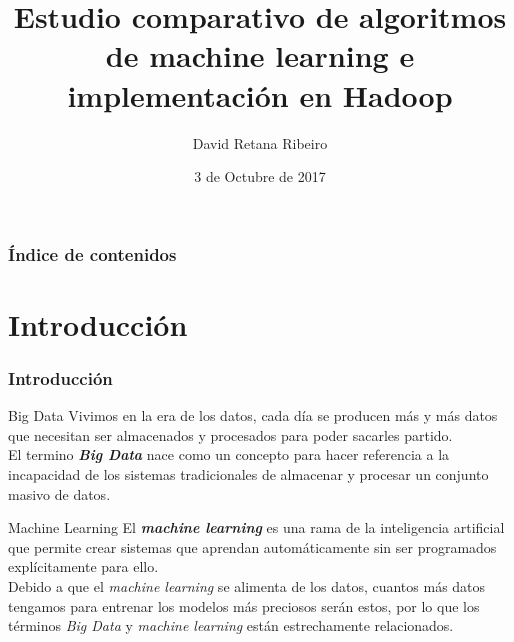 \documentclass{beamer}
\title[Machine Learning y Big Data]{Estudio comparativo de algoritmos de machine learning e implementación en Hadoop}
\author{David Retana Ribeiro}
\institute[UCM]{Universidad Complutense de Madrid \\ \medskip \texttt{davidret@ucm.es}}
\date{3 de Octubre de 2017}
\begin{document}

\begin{frame} %
\titlepage
\end{frame}


\begin{frame} %
\frametitle{Índice de contenidos}
\tableofcontents
\end{frame}


\section{Introducción}

\begin{frame} %
  \frametitle{Introducción}
  \begin{block}{Big Data}
  Vivimos en la era de los datos, cada día se producen más y más datos  que necesitan ser almacenados y
  procesados para poder sacarles partido.\\
  El termino \textbf{\textit{Big Data}} nace como un concepto para hacer referencia a la incapacidad de 
  los sistemas tradicionales de almacenar y procesar un conjunto masivo de datos.
  \end{block}
  
  \begin{block}{Machine Learning}
  El \textbf{\textit{machine learning}} es una rama de la inteligencia artificial que permite crear sistemas que 
  aprendan automáticamente sin ser programados explícitamente para ello.\\
  Debido a que el \textit{machine learning} se alimenta de los datos, cuantos más datos tengamos para
  entrenar los modelos más preciosos serán estos, por lo que los términos \textit{Big Data} y \textit{machine learning}
  están estrechamente relacionados.
  \end{block}
\end{frame}

\end{document}
